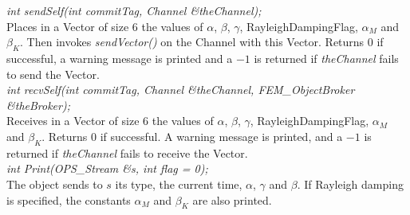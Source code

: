 {\em int sendSelf(int commitTag, Channel \&theChannel); } \\ 
Places in a Vector of size 6 the values of $\alpha$, $\beta$, $\gamma$, 
RayleighDampingFlag, $\alpha_M$ and $\beta_K$.  Then
invokes {\em sendVector()} on the Channel with this Vector. Returns
$0$ if successful, a warning message is printed and a $-1$ is
returned if {\em theChannel} fails to send the Vector. \\ 

{\em int recvSelf(int commitTag, Channel \&theChannel, 
FEM\_ObjectBroker \&theBroker); } \\ 
Receives in a Vector of size 6 the values of $\alpha$, $\beta$, $\gamma$, 
RayleighDampingFlag, $\alpha_M$ and $\beta_K$. Returns $0$
if successful. A warning message is printed, and a $-1$ is returned if
{\em theChannel} fails to receive the Vector.\\

{\em int Print(OPS\_Stream \&s, int flag = 0);}\\
The object sends to $s$ its type, the current time, $\alpha$, $\gamma$ and
$\beta$. If Rayleigh damping is specified, the constants $\alpha_M$ and
$\beta_K$ are also printed.


